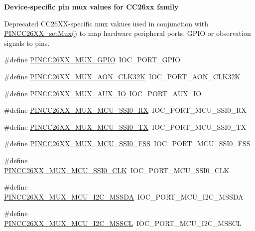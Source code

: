 \begin{Indent}{\bf Device-\/specific pin mux values for C\+C26xx family}
{\begin{DoxyRefDesc}{Deprecated}
C\+C26\+X\+X-\/specific mux vakues used in conjunction with \hyperlink{_p_i_n_c_c26_x_x_8h_ac8cbb649db80dd03d8e8a487aef43294}{P\+I\+N\+C\+C26\+X\+X\+\_\+set\+Mux()} to map hardware peripheral ports, G\+P\+I\+O or observation signals to pins. \end{DoxyRefDesc}
}\begin{DoxyCompactItemize}
\item 
\#define \hyperlink{_p_i_n_c_c26_x_x_8h_afc65e6d65f939680cc596a207713b5c4}{P\+I\+N\+C\+C26\+X\+X\+\_\+\+M\+U\+X\+\_\+\+G\+P\+I\+O}~I\+O\+C\+\_\+\+P\+O\+R\+T\+\_\+\+G\+P\+I\+O
\item 
\#define \hyperlink{_p_i_n_c_c26_x_x_8h_a99871b823a34287bfc2027606551db4d}{P\+I\+N\+C\+C26\+X\+X\+\_\+\+M\+U\+X\+\_\+\+A\+O\+N\+\_\+\+C\+L\+K32\+K}~I\+O\+C\+\_\+\+P\+O\+R\+T\+\_\+\+A\+O\+N\+\_\+\+C\+L\+K32\+K
\item 
\#define \hyperlink{_p_i_n_c_c26_x_x_8h_a7fc71cdd74fbd97d4297ffed39302713}{P\+I\+N\+C\+C26\+X\+X\+\_\+\+M\+U\+X\+\_\+\+A\+U\+X\+\_\+\+I\+O}~I\+O\+C\+\_\+\+P\+O\+R\+T\+\_\+\+A\+U\+X\+\_\+\+I\+O
\item 
\#define \hyperlink{_p_i_n_c_c26_x_x_8h_ac72b13e3e19d75a4ce2240955786660d}{P\+I\+N\+C\+C26\+X\+X\+\_\+\+M\+U\+X\+\_\+\+M\+C\+U\+\_\+\+S\+S\+I0\+\_\+\+R\+X}~I\+O\+C\+\_\+\+P\+O\+R\+T\+\_\+\+M\+C\+U\+\_\+\+S\+S\+I0\+\_\+\+R\+X
\item 
\#define \hyperlink{_p_i_n_c_c26_x_x_8h_a330141f9fd840aec1b7c4cabc111363a}{P\+I\+N\+C\+C26\+X\+X\+\_\+\+M\+U\+X\+\_\+\+M\+C\+U\+\_\+\+S\+S\+I0\+\_\+\+T\+X}~I\+O\+C\+\_\+\+P\+O\+R\+T\+\_\+\+M\+C\+U\+\_\+\+S\+S\+I0\+\_\+\+T\+X
\item 
\#define \hyperlink{_p_i_n_c_c26_x_x_8h_a1ac8e06c048c6a1951e11054abcf1c60}{P\+I\+N\+C\+C26\+X\+X\+\_\+\+M\+U\+X\+\_\+\+M\+C\+U\+\_\+\+S\+S\+I0\+\_\+\+F\+S\+S}~I\+O\+C\+\_\+\+P\+O\+R\+T\+\_\+\+M\+C\+U\+\_\+\+S\+S\+I0\+\_\+\+F\+S\+S
\item 
\#define \hyperlink{_p_i_n_c_c26_x_x_8h_a77b7d2034982c09c8c3a75591b226e95}{P\+I\+N\+C\+C26\+X\+X\+\_\+\+M\+U\+X\+\_\+\+M\+C\+U\+\_\+\+S\+S\+I0\+\_\+\+C\+L\+K}~I\+O\+C\+\_\+\+P\+O\+R\+T\+\_\+\+M\+C\+U\+\_\+\+S\+S\+I0\+\_\+\+C\+L\+K
\item 
\#define \hyperlink{_p_i_n_c_c26_x_x_8h_aa3db9a339c53a66396c6fdfde6d6062c}{P\+I\+N\+C\+C26\+X\+X\+\_\+\+M\+U\+X\+\_\+\+M\+C\+U\+\_\+\+I2\+C\+\_\+\+M\+S\+S\+D\+A}~I\+O\+C\+\_\+\+P\+O\+R\+T\+\_\+\+M\+C\+U\+\_\+\+I2\+C\+\_\+\+M\+S\+S\+D\+A
\item 
\#define \hyperlink{_p_i_n_c_c26_x_x_8h_aa617fb5a0aeeda3e4bf7150d5e76a397}{P\+I\+N\+C\+C26\+X\+X\+\_\+\+M\+U\+X\+\_\+\+M\+C\+U\+\_\+\+I2\+C\+\_\+\+M\+S\+S\+C\+L}~I\+O\+C\+\_\+\+P\+O\+R\+T\+\_\+\+M\+C\+U\+\_\+\+I2\+C\+\_\+\+M\+S\+S\+C\+L

\end{DoxyCompactItemize}
\end{Indent}
